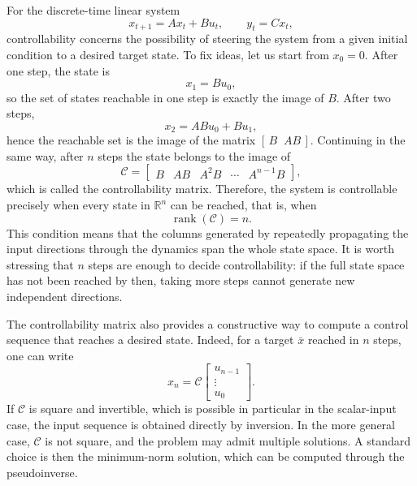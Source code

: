 For the discrete-time linear system
\[
x_{t+1}=Ax_t+Bu_t,\qquad y_t=Cx_t,
\]
controllability concerns the possibility of steering the system from a given initial condition to a desired target state. To fix ideas, let us start from \(x_0=0\). After one step, the state is
\[
x_1 = Bu_0,
\]
so the set of states reachable in one step is exactly the image of \(B\). After two steps,
\[
x_2 = ABu_0 + Bu_1,
\]
hence the reachable set is the image of the matrix \([\,B\;\;AB\,]\). Continuing in the same way, after \(n\) steps the state belongs to the image of
\[
\mathcal{C} = \begin{bmatrix} B & AB & A^2B & \cdots & A^{n-1}B \end{bmatrix},
\]
which is called the controllability matrix. Therefore, the system is controllable precisely when every state in \(\mathbb{R}^n\) can be reached, that is, when
\[
\operatorname{rank}(\mathcal{C}) = n.
\]
This condition means that the columns generated by repeatedly propagating the input directions through the dynamics span the whole state space. It is worth stressing that \(n\) steps are enough to decide controllability: if the full state space has not been reached by then, taking more steps cannot generate new independent directions.

The controllability matrix also provides a constructive way to compute a control sequence that reaches a desired state. Indeed, for a target \(\bar x\) reached in \(n\) steps, one can write
\[
x_n = \mathcal{C}
\begin{bmatrix}
u_{n-1}\\
\vdots\\
u_0
\end{bmatrix}.
\]
If \(\mathcal{C}\) is square and invertible, which is possible in particular in the scalar-input case, the input sequence is obtained directly by inversion. In the more general case, \(\mathcal{C}\) is not square, and the problem may admit multiple solutions. A standard choice is then the minimum-norm solution, which can be computed through the pseudoinverse.

